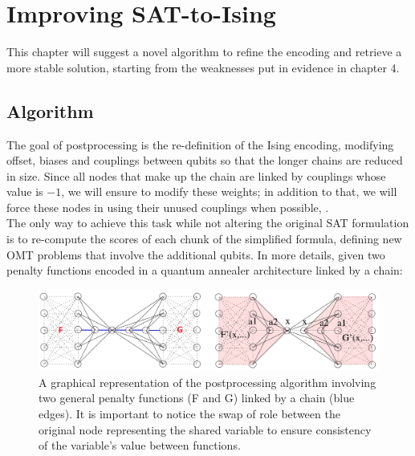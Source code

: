 \chapter{Improving SAT-to-Ising}
\label{cha:QAcore}

This chapter will suggest a novel algorithm to refine the encoding and retrieve a more stable solution, starting from the weaknesses put in evidence in chapter 4. 

\section{Algorithm}

The goal of postprocessing is the re-definition of the Ising encoding, modifying offset, biases and couplings between qubits so that the longer chains are reduced in size. Since all nodes that make up the chain are linked by couplings whose value is $-1$, we will ensure to modify these weights; in addition to that, we will force these nodes in using their unused couplings when possible, . \\
The only way to achieve this task while not altering the original SAT formulation is to re-compute the scores of each chunk of the simplified formula, defining new OMT problems that involve the additional qubits. In more details, given two penalty functions encoded in a quantum annealer architecture linked by a chain:
\begin{figure}[b]
	\begin{center}
	\includegraphics[width=\textwidth]{images/PostAlg.png}
	\caption{A graphical representation of the postprocessing algorithm involving two general penalty functions (F and G) linked by a chain (blue edges). It is important to notice the swap of role between the original node representing the shared variable to ensure consistency of the variable's value between functions.}
	\end{center}
\end{figure}

